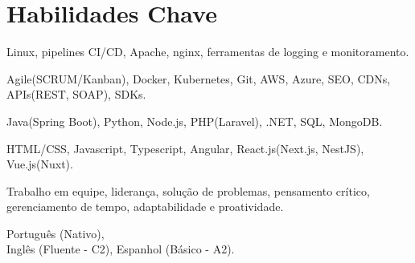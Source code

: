 \section{Habilidades Chave}
{Linux, pipelines CI/CD, Apache, nginx, ferramentas de logging e monitoramento.}

{Agile(SCRUM/Kanban), Docker, Kubernetes, Git, AWS, Azure, SEO, CDNs, APIs(REST, SOAP), SDKs.}

{Java(Spring Boot), Python, Node.js, PHP(Laravel), .NET, SQL, MongoDB.}

{HTML/CSS, Javascript, Typescript, Angular, React.js(Next.js, NestJS), Vue.js(Nuxt).}

{Trabalho em equipe, liderança, solução de problemas, pensamento crítico, gerenciamento de tempo, adaptabilidade e proatividade.}

{Português (Nativo), \\ Inglês (Fluente - C2), Espanhol (Básico - A2).}
